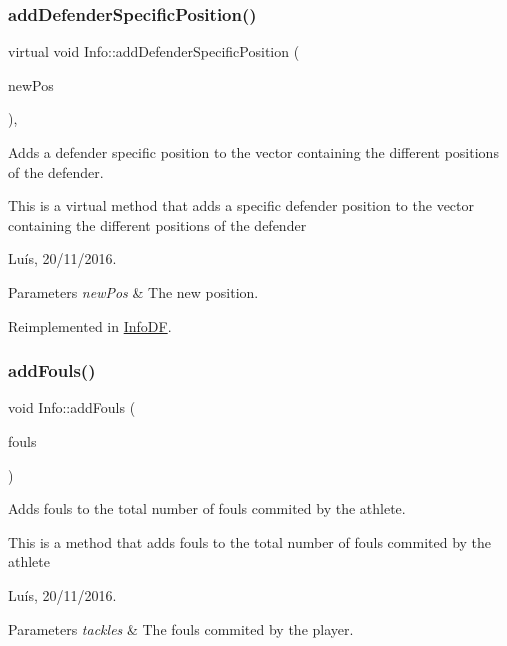 \subsubsection{\texorpdfstring{add\+Defender\+Specific\+Position()}{addDefenderSpecificPosition()}}
{\footnotesize\ttfamily virtual void Info\+::add\+Defender\+Specific\+Position (\begin{DoxyParamCaption}\item[{\hyperlink{_utils_8hpp_a94ee089ecd5db12c81c7edbefaabff4d}{Defender\+Position}}]{new\+Pos }\end{DoxyParamCaption})\hspace{0.3cm}{\ttfamily [inline]}, {\ttfamily [virtual]}}



Adds a defender specific position to the vector containing the different positions of the defender. 

This is a virtual method that adds a specific defender position to the vector containing the different positions of the defender

Luís, 20/11/2016. 


\begin{DoxyParams}{Parameters}
{\em new\+Pos} & The new position. \\
\hline
\end{DoxyParams}


Reimplemented in \hyperlink{class_info_d_f_aaa161b2c4a56878d3c691ec4de3129c3}{Info\+DF}.

\hypertarget{class_info_aa4f58053aaff1dc1112f6c6396b64117}{}\label{class_info_aa4f58053aaff1dc1112f6c6396b64117} 
\subsubsection{\texorpdfstring{add\+Fouls()}{addFouls()}}
{\footnotesize\ttfamily void Info\+::add\+Fouls (\begin{DoxyParamCaption}\item[{unsigned int}]{fouls }\end{DoxyParamCaption})}



Adds fouls to the total number of fouls commited by the athlete. 

This is a method that adds fouls to the total number of fouls commited by the athlete

Luís, 20/11/2016. 


\begin{DoxyParams}{Parameters}
{\em tackles} & The fouls commited by the player. \\
\hline
\end{DoxyParams}
\hypertarget{class_info_ae252f25a8dff58017b92ba7a5ad02bc0}{}\label{class_info_ae252f25a8dff58017b92ba7a5ad02bc0} 
